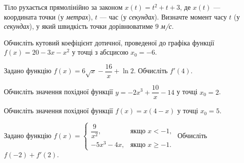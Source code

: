 \documentclass[12pt]{article}
\begin{document}

\begin{samepage}
\noindent\zadnum Тіло рухається прямолінійно за законом $x(t) = t^2 + t + 3$, де $x(t)$ — координата точки (у \textit{метрах}), $t$ — час (у \textit{секундах}). Визначте момент часу $t$ (у \textit{секундах}), у який швидкість точки дорівнюватиме $9$ \textit{м/с}. 

\nmtnobreak
\nopagebreak\nbvspace{0.5cm}
\nmtAnswerBox
\par{}
\end{samepage}

\begin{samepage}
\noindent\zadnum Обчисліть кутовий коефіцієнт дотичної, проведеної до графіка функції $f(x) = 20 - 3x - x^2$ у точці з абсцисою $x_0 = -6$. 

\nmtnobreak
\nopagebreak\nbvspace{0.5cm}
\nmtAnswerBox
\par{}
\end{samepage}

\begin{samepage}
\noindent\zadnum Задано функцію $f(x) = 6\sqrt{x} - \dfrac{16}{x} + \ln 2$. Обчисліть $f'(4)$. 

\nmtnobreak
\nopagebreak\nbvspace{0.5cm}
\nmtAnswerBox
\par{}
\end{samepage}

\begin{samepage}
\noindent\zadnum Обчисліть значення похідної функції $y = -2x^3 + \dfrac{10}{x} - 14$ у точці $x_0 = 2$. 

\nmtnobreak
\nopagebreak\nbvspace{0.5cm}
\nmtAnswerBox
\par{}
\end{samepage}

\begin{samepage}
\noindent\zadnum Обчисліть значення похідної функції $f(x) = x(4-x)$ у точці $x_0 = 5$. 

\nmtnobreak
\nopagebreak\nbvspace{0.5cm}
\nmtAnswerBox
\par{}
\end{samepage}

\begin{samepage}
\noindent\zadnum Задано функцію $f(x) = \begin{cases} \dfrac{9}{x^2}, & \text{якщо } x < -1, \\ -5x^3 - 4x, & \text{якщо } x \geqslant -1. \end{cases}$ \quad Обчисліть $f(-2) + f'(2)$. 

\nmtnobreak
\nopagebreak\nbvspace{0.5cm}
\nmtAnswerBox
\par{}
\end{samepage}
\end{document}
